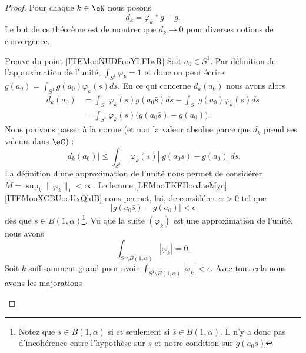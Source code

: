 \begin{proof}
    Pour chaque \( k\in \eN\) nous posons 
    \begin{equation}
        d_k=\varphi_k*g-g.
    \end{equation}
    Le but de ce théorème est de montrer que \( d_k\to 0\) pour diverses notions de convergence.
    \begin{subproof}
        \item[Preuve du point \ref{ITEMooNUDFooYLFIwR}]
            Soit \( a_0\in S^1\). Par définition de l'approximation de l'unité, \( \int_{S^1}\varphi_k=1\) et donc on peut écrire \( g(a_0)=\int_{S^1}g(a_0)\varphi_k(s)ds\). En ce qui concerne \( d_k(a_0)\) nous avons alors
            \begin{subequations}
                \begin{align}
                    d_k(a_0)&=\int_{S^1}\varphi_k(s)g(a_0\bar s)ds-\int_{S^1}g(a_0)\varphi_k(s)ds\\
                    &=\int_{S^1}\varphi_k(s)\big( g(a_0\bar s)-g(a_0) \big).
                \end{align}
            \end{subequations}
            Nous pouvons passer à la norme (et non la valeur absolue parce que \( d_k\) prend ses valeurs dans \( \eC\)) :
            \begin{equation}
                | d_k(a_0) |\leq \int_{S^1}| \varphi_k(s) |\big| g(a_0\bar s)-g(a_0) \big|ds.
            \end{equation}
            La définition d'une approximation de l'unité nous permet de considérer \( M=\sup_k\| \varphi_k \|_1<\infty\). Le lemme \ref{LEMooTKFHooJaeMyc}\ref{ITEMooXCBUooUxQldB} nous permet, lui, de considérer \( \alpha>0\) tel que 
            \begin{equation}
                | g(a_0\bar s)-g(a_0) |<\epsilon
            \end{equation}
            dès que \( s\in B(1,\alpha)\)\footnote{Notez que \( s\in B(1,\alpha)\) si et seulement si \( \bar s\in B(1,\alpha)\). Il n'y a donc pas d'incohérence entre l'hypothèse sur \( s\) et notre condition sur \( g(a_0\bar s)\)}. Vu que la suite \( (\varphi_k)\) est une approximation de l'unité, nous avons
            \begin{equation}
                \int_{S^1\setminus B(1,\alpha)}| \varphi_k |=0.
            \end{equation}
            Soit \( k\) suffisamment grand pour avoir \( \int_{S^1\setminus B(1,\alpha)}| \varphi_k |<\epsilon\). Avec tout cela nous avons les majorations

\end{subproof}
\end{proof}
